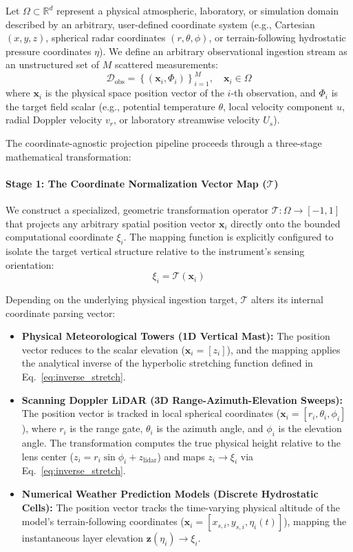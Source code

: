 Let $\Omega \subset \mathbb{R}^d$ represent a physical atmospheric, laboratory, or simulation domain described by an arbitrary, user-defined coordinate system (e.g., Cartesian $(x,y,z)$, spherical radar coordinates $(r, \theta, \phi)$, or terrain-following hydrostatic pressure coordinates $\eta$). We define an arbitrary observational ingestion stream as an unstructured set of $M$ scattered measurements:
\begin{equation}
\mathcal{D}_{\mathrm{obs}} = \left\{ \left(\mathbf{x}_i, \Phi_i\right) \right\}_{i=1}^M, \quad \mathbf{x}_i \in \Omega
\label{eq:scattered_data_set}
\end{equation}
where $\mathbf{x}_i$ is the physical space position vector of the $i$-th observation, and $\Phi_i$ is the target field scalar (e.g., potential temperature $\theta$, local velocity component $u$, radial Doppler velocity $v_r$, or laboratory streamwise velocity $U_s$).

The coordinate-agnostic projection pipeline proceeds through a three-stage mathematical transformation:

\paragraph{Stage 1: The Coordinate Normalization Vector Map ($\mathcal{T}$)}
We construct a specialized, geometric transformation operator $\mathcal{T}: \Omega \rightarrow [-1, 1]$ that projects any arbitrary spatial position vector $\mathbf{x}_i$ directly onto the bounded computational coordinate $\xi_i$. The mapping function is explicitly configured to isolate the target vertical structure relative to the instrument's sensing orientation:
\begin{equation}
\xi_i = \mathcal{T}(\mathbf{x}_i)
\label{eq:generalized_tau_map}
\end{equation}

Depending on the underlying physical ingestion target, $\mathcal{T}$ alters its internal coordinate parsing vector:
\begin{itemize}
\item \textbf{Physical Meteorological Towers (1D Vertical Mast):} The position vector reduces to the scalar elevation ($\mathbf{x}_i = [z_i]$), and the mapping applies the analytical inverse of the hyperbolic stretching function defined in Eq.~\ref{eq:inverse_stretch}.
\item \textbf{Scanning Doppler LiDAR (3D Range-Azimuth-Elevation Sweeps):} The position vector is tracked in local spherical coordinates ($\mathbf{x}_i = [r_i, \theta_i, \phi_i]$), where $r_i$ is the range gate, $\theta_i$ is the azimuth angle, and $\phi_i$ is the elevation angle. The transformation computes the true physical height relative to the lens center ($z_i = r_i \sin \phi_i + z_{\mathrm{lidar}}$) and maps $z_i \rightarrow \xi_i$ via Eq.~\ref{eq:inverse_stretch}.
\item \textbf{Numerical Weather Prediction Models (Discrete Hydrostatic Cells):} The position vector tracks the time-varying physical altitude of the model's terrain-following coordinates ($\mathbf{x}_i = [x_{s,i}, y_{s,i}, \eta_i(t)]$), mapping the instantaneous layer elevation $\mathbf{z}(\eta_i) \rightarrow \xi_i$.
\end{itemize}

